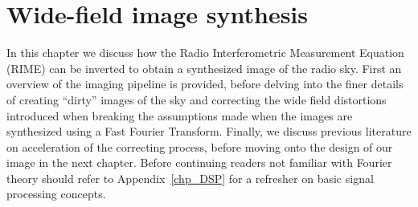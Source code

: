 \chapter{Wide-field image synthesis}
\label{chapter_synthesis}
In this chapter we discuss how the Radio Interferometric Measurement Equation (RIME) can be inverted to obtain a synthesized image of the radio sky. First an overview of the imaging pipeline is provided, before
delving into the finer details of creating ``dirty'' images of the sky and correcting the wide field distortions introduced when breaking the assumptions made when the images 
are synthesized using a Fast Fourier Transform. Finally, we discuss previous literature on acceleration of the correcting process, before moving onto the design of our image in the next chapter. Before
continuing readers not familiar with Fourier theory should refer to Appendix~\ref{chp_DSP} for a refresher on basic signal processing concepts.
